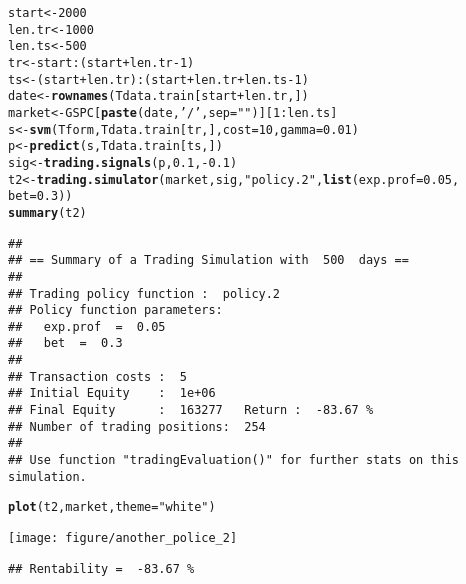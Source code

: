 \documentclass{article}\usepackage[]{graphicx}\usepackage[]{color}
\makeatletter
\def\maxwidth{ %
  \ifdim\Gin@nat@width>\linewidth
    \linewidth
  \else
    \Gin@nat@width
  \fi
}
\newcommand{\hlnum}[1]{\textcolor[rgb]{0.686,0.059,0.569}{#1}}%
\newcommand{\hlstr}[1]{\textcolor[rgb]{0.192,0.494,0.8}{#1}}%
\newcommand{\hlopt}[1]{\textcolor[rgb]{0,0,0}{#1}}%
\newcommand{\hlstd}[1]{\textcolor[rgb]{0.345,0.345,0.345}{#1}}%
\newcommand{\hlkwb}[1]{\textcolor[rgb]{0.69,0.353,0.396}{#1}}%
\newcommand{\hlkwc}[1]{\textcolor[rgb]{0.333,0.667,0.333}{#1}}%
\newcommand{\hlkwd}[1]{\textcolor[rgb]{0.737,0.353,0.396}{\textbf{#1}}}%
\newenvironment{kframe}{%
 \def\at@end@of@kframe{}%
 \ifinner\ifhmode%
  \def\at@end@of@kframe{\end{minipage}}%
  \begin{minipage}{\columnwidth}%
 \fi\fi%
 \def\FrameCommand##1{\hskip\@totalleftmargin \hskip-\fboxsep
 \colorbox{shadecolor}{##1}\hskip-\fboxsep
     \hskip-\linewidth \hskip-\@totalleftmargin \hskip\columnwidth}%
 \MakeFramed {\advance\hsize-\width
   \@totalleftmargin\z@ \linewidth\hsize
   \@setminipage}}%
 {\par\unskip\endMakeFramed%
 \at@end@of@kframe}
\newenvironment{knitrout}{}{} %
\makeatother
\begin{document}
\begin{knitrout}
\color{fgcolor}\begin{kframe}
\begin{alltt}
\hlstd{start} \hlkwb{<-} \hlnum{2000}
\hlstd{len.tr} \hlkwb{<-} \hlnum{1000}
\hlstd{len.ts} \hlkwb{<-} \hlnum{500}
\hlstd{tr} \hlkwb{<-} \hlstd{start}\hlopt{:}\hlstd{(start}\hlopt{+}\hlstd{len.tr} \hlopt{-} \hlnum{1}\hlstd{)}
\hlstd{ts} \hlkwb{<-} \hlstd{(start}\hlopt{+}\hlstd{len.tr)}\hlopt{:}\hlstd{(start}\hlopt{+}\hlstd{len.tr}\hlopt{+}\hlstd{len.ts}\hlopt{-}\hlnum{1}\hlstd{)}
\hlstd{date} \hlkwb{<-} \hlkwd{rownames}\hlstd{(Tdata.train[start}\hlopt{+}\hlstd{len.tr, ])}
\hlstd{market} \hlkwb{<-} \hlstd{GSPC[}\hlkwd{paste}\hlstd{(date,} \hlstr{'/'}\hlstd{,} \hlkwc{sep} \hlstd{=} \hlstr{""}\hlstd{)][}\hlnum{1}\hlopt{:}\hlstd{len.ts]}
\hlstd{s} \hlkwb{<-} \hlkwd{svm}\hlstd{(Tform, Tdata.train[tr, ],} \hlkwc{cost} \hlstd{=} \hlnum{10}\hlstd{,} \hlkwc{gamma} \hlstd{=} \hlnum{0.01}\hlstd{)}
\hlstd{p} \hlkwb{<-} \hlkwd{predict}\hlstd{(s, Tdata.train[ts, ])}
\hlstd{sig} \hlkwb{<-} \hlkwd{trading.signals}\hlstd{(p,} \hlnum{0.1}\hlstd{,} \hlopt{-}\hlnum{0.1}\hlstd{)}
\hlstd{t2} \hlkwb{<-} \hlkwd{trading.simulator}\hlstd{(market, sig,} \hlstr{"policy.2"}\hlstd{,} \hlkwd{list}\hlstd{(}\hlkwc{exp.prof} \hlstd{=} \hlnum{0.05}\hlstd{,}
                                                      \hlkwc{bet} \hlstd{=} \hlnum{0.3}\hlstd{))}
\hlkwd{summary}\hlstd{(t2)}
\end{alltt}
\begin{verbatim}
## 
## == Summary of a Trading Simulation with  500  days ==
## 
## Trading policy function :  policy.2 
## Policy function parameters:
## 	 exp.prof  =  0.05 
## 	 bet  =  0.3 
## 
## Transaction costs :  5 
## Initial Equity    :  1e+06 
## Final Equity      :  163277   Return :  -83.67 %
## Number of trading positions:  254 
## 
## Use function "tradingEvaluation()" for further stats on this simulation.
\end{verbatim}
\begin{alltt}
\hlkwd{plot}\hlstd{(t2, market,} \hlkwc{theme} \hlstd{=} \hlstr{"white"}\hlstd{)}
\end{alltt}
\end{kframe}
\texttt{[image: figure/another\_police\_2]} 
\begin{kframe}\begin{verbatim}
## Rentability =  -83.67 %
\end{verbatim}
\end{kframe}
\end{knitrout}
\end{document}
